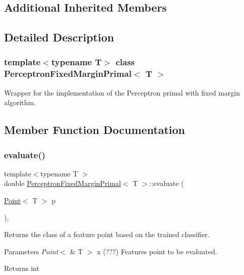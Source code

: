 \subsection*{Additional Inherited Members}


\subsection{Detailed Description}
\subsubsection*{template$<$typename T$>$\newline
class Perceptron\+Fixed\+Margin\+Primal$<$ T $>$}

Wrapper for the implementation of the Perceptron primal with fixed margin algorithm. 

\subsection{Member Function Documentation}
\mbox{\label{class_perceptron_fixed_margin_primal_a5bfe0f03533361017b594c3fe67f0905}} 
\subsubsection{\texorpdfstring{evaluate()}{evaluate()}}
{\footnotesize\ttfamily template$<$typename T $>$ \\
double \hyperlink{class_perceptron_fixed_margin_primal}{Perceptron\+Fixed\+Margin\+Primal}$<$ T $>$\+::evaluate (\begin{DoxyParamCaption}\item[{\hyperlink{class_point}{Point}$<$ T $>$}]{p }\end{DoxyParamCaption})\hspace{0.3cm}{\ttfamily [override]}, {\ttfamily [virtual]}}



Returns the class of a feature point based on the trained classifier. 


\begin{DoxyParams}{Parameters}
{\em Point$<$} & T $>$ x (???) Features point to be evaluated. \\
\hline
\end{DoxyParams}
\begin{DoxyReturn}{Returns}
int 
\end{DoxyReturn}



